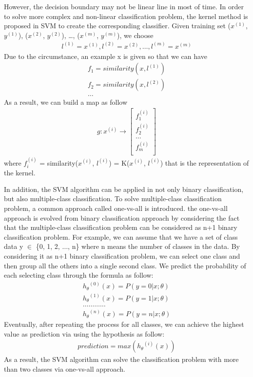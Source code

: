 However, the decision boundary may not be linear line in most of time. In order to solve more complex and non-linear classification problem, the kernel method is proposed in SVM to create the corresponding classifier. Given training set ($x^{(1)}$, $y^{(1)}$), ($x^{(2)}$, $y^{(2)}$), \ldots, ($x^{(m)}$, $y^{(m)}$), we choose 
\begin{align*}
    l^{(1)} = x^{(1)}, l^{(2)} = x^{(2)}, \ldots, l^{(m)} = x^{(m)}
\end{align*}
Due to the circumstance, an example x is given so that we can have
\begin{align*}
    f_1 = similarity(x, l^{(1)})\\
    f_2 = similarity(x, l^{(2)})\\
    \dots 
\end{align*}
As a result, we can build a map as follow
\begin{align*}
    g: x^{(i)} \rightarrow 
    \begin{bmatrix}
        f_1^{(i)} \\
        f_2^{(i)} \\
        \dots \\
        f_m^{(i)} \\
    \end{bmatrix}
\end{align*}
where $f_i^{(i)}$ = similarity($x^{(i)}$, $l^{(i)}$) = K($x^{(i)}$, $l^{(i)}$) that is the representation of the kernel.\par
In addition, the SVM algorithm can be applied in not only binary classification, but also multiple-class classification. To solve multiple-class classification problem, a common approach called one-vs-all is introduced. the one-vs-all approach is evolved from binary classification approach by considering the fact that the multiple-class classification problem can be considered as n+1 binary classification problem. For example, we can assume that we have a set of class data y $\in$ \{0, 1, 2, $\ldots$, n\} where n means the number of classes in the data. By considering it as n+1 binary classification problem, we can select one class and then group all the others into a single second class. We predict the probability of each selecting class through the formula as follow:
\begin{align*}
    {h_\theta}^{(0)}(x) = P (y = 0 | x ;\theta)\\
    {h_\theta}^{(1)}(x) = P (y = 1 | x ;\theta)\\
    \ldots \ldots \ldots \ldots\\
    {h_\theta}^{(n)}(x) = P (y = n | x ;\theta)
\end{align*}
Eventually, after repeating the process for all classes, we can achieve the highest value as prediction via using the hypothesis as follow:
\begin{align*}
    prediction = max ({h_\theta}^{(i)}(x))
\end{align*}
As a result, the SVM algorithm can solve the classification problem with more than two classes via one-vs-all approach.

